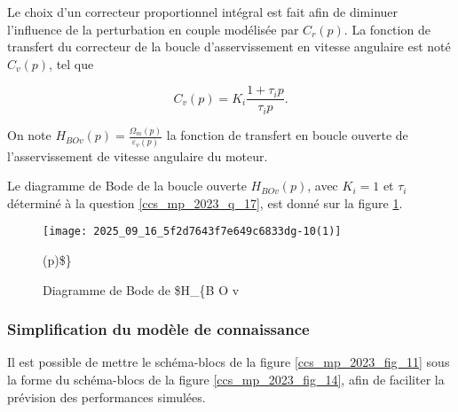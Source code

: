 Le choix d'un correcteur proportionnel intégral est fait afin de diminuer l'influence de la perturbation en couple modélisée par $C_{r}(p)$. La fonction de transfert du correcteur de la boucle d'asservissement en vitesse angulaire est noté $C_{v}(p)$, tel que

$$
C_{v}(p)=K_{i} \frac{1+\tau_{i} p}{\tau_{i} p} .
$$

On note $H_{B O v}(p)=\frac{\Omega_{m}(p)}{\varepsilon_{v}(p)}$ la fonction de transfert en boucle ouverte de l'asservissement de vitesse angulaire du moteur.

\ifprof
\begin{corrige}
\end{corrige}
\else
\fi


Le diagramme de Bode de la boucle ouverte $H_{B O v}(p)$, avec $K_{i}=1$ et $\tau_{i}$ déterminé à la question \ref{ccs_mp_2023_q_17}, est donné sur la figure \ref{ccs_mp_2023_fig_13}.



\begin{figure}[!h]
\centering
\texttt{[image: 2025\_09\_16\_5f2d7643f7e649c6833dg-10(1)]}
\caption{\label{ccs_mp_2023_fig_13}   Diagramme de Bode de \$H\_\{B O v}(p)\$\}
\end{figure}



\ifprof
\begin{corrige}
\end{corrige}
\else
\fi



\subsubsection{Simplification du modèle de connaissance}%
Il est possible de mettre le schéma-blocs de la figure \ref{ccs_mp_2023_fig_11} sous la forme du schéma-blocs de la figure \ref{ccs_mp_2023_fig_14}, afin de faciliter la prévision des performances simulées.

